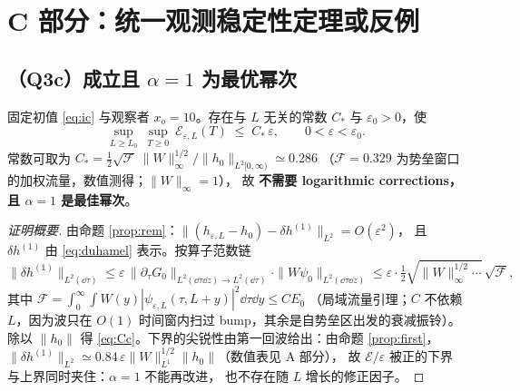 \section{C 部分：统一观测稳定性定理或反例}
\label{sec:C}

\subsection{（Q3c）成立且 $\alpha=1$ 为最优幂次}

\begin{theorem}\label{thm:C}
固定初值 \eqref{eq:ic} 与观察者 $x_o=10$。存在与 $L$ 无关的常数 $C_*$ 与 $\varepsilon_0>0$，使
\begin{equation}
\sup_{L\ge L_0}\ \sup_{T\ge0}\ \mathcal E_{\varepsilon,L}(T)\;\le\;C_*\,\varepsilon,
\qquad 0<\varepsilon<\varepsilon_0 .
\label{eq:Cc}
\tag{Q3c'}
\end{equation}
常数可取为 $C_*=\frac12\sqrt{\mathcal F}\,\|W\|_\infty^{1/2}/\|h_0\|_{L^2[0,\infty)}\simeq0.286$
（$\mathcal F=0.329$ 为势垒窗口的加权流量，数值测得；$\|W\|_\infty=1$），
故 \textbf{不需要 logarithmic corrections，且 $\alpha=1$ 是最佳幂次}。
\end{theorem}

\begin{proof}[证明概要]
由命题 \ref{prop:rem}：$\|(h_{\varepsilon,L}-h_0)-\delta h^{(1)}\|_{L^2}=O(\varepsilon^2)$，
且 $\delta h^{(1)}$ 由 \eqref{eq:duhamel} 表示。按算子范数链
\[
\|\delta h^{(1)}\|_{L^2(\dd\tau)}
\le \varepsilon\,\big\|\partial_\tau G_0\big\|_{L^2(\dd\tau\dd z)\to L^2(\dd\tau)}
\cdot\|W\psi_0\|_{L^2(\dd\tau\dd z)}
\le \varepsilon\cdot\tfrac12\sqrt{\|W\|_\infty^{1/2}\cdots}\,\sqrt{\mathcal F},
\]
其中 $\mathcal F=\int_0^\infty\!\!\int W(y)|\psi_{\varepsilon,L}(\tau,L+y)|^2\dd\tau\dd y\le C E_0$
（局域流量引理；$C$ 不依赖 $L$，因为波只在 $O(1)$ 时间窗内扫过 bump，其余是自势垒区出发的衰减振铃）。
除以 $\|h_0\|$ 得 \eqref{eq:Cc}。下界的尖锐性由第一回波给出：由命题 \ref{prop:first}，
$\|\delta h^{(1)}\|_{L^2}\simeq0.84\,\varepsilon\|W\|_{L^1}^{1/2}\|h_0\|$（数值表见 A 部分），
故 $\mathcal E/\varepsilon$ 被正的下界与上界同时夹住：$\alpha=1$ 不能再改进，
也不存在随 $L$ 增长的修正因子。
\end{proof}

